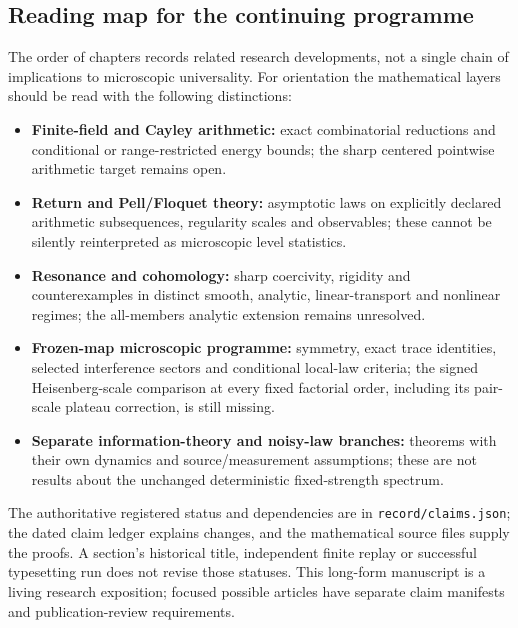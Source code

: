 \subsection{Reading map for the continuing programme}
\label{subsec:reader-map}
The order of chapters records related research developments, not a single
chain of implications to microscopic universality. For orientation the
mathematical layers should be read with the following distinctions:
\begin{itemize}[leftmargin=*,itemsep=2pt]
\item \textbf{Finite-field and Cayley arithmetic:} exact combinatorial
reductions and conditional or range-restricted energy bounds; the sharp
centered pointwise arithmetic target remains open.
\item \textbf{Return and Pell/Floquet theory:} asymptotic laws on explicitly
declared arithmetic subsequences, regularity scales and observables; these
cannot be silently reinterpreted as microscopic level statistics.
\item \textbf{Resonance and cohomology:} sharp coercivity, rigidity and
counterexamples in distinct smooth, analytic, linear-transport and nonlinear
regimes; the all-members analytic extension remains unresolved.
\item \textbf{Frozen-map microscopic programme:} symmetry, exact trace
identities, selected interference sectors and conditional local-law
criteria; the signed Heisenberg-scale comparison at every fixed factorial
order, including its pair-scale plateau correction, is still missing.
\item \textbf{Separate information-theory and noisy-law branches:} theorems
with their own dynamics and source/measurement assumptions; these are not
results about the unchanged deterministic fixed-strength spectrum.
\end{itemize}
The authoritative registered status and dependencies are in
\texttt{record/claims.json}; the dated claim ledger explains changes, and
the mathematical source files supply the proofs. A section's
historical title, independent finite replay or successful typesetting run
does not revise those statuses. This long-form manuscript is a living
research exposition; focused possible articles have separate claim
manifests and publication-review requirements.
